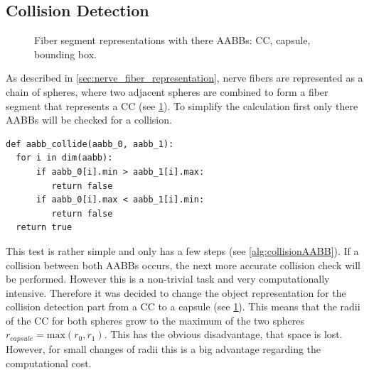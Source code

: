 \subsection{Collision Detection}
\label{sec:collisionDetection}
%
\begin{figure}[!t]
    \centering
    \setlength{\tikzwidth}{0.75\textwidth}
    \tikzset{external/export=false}
	\caption[cc and co]{Fiber segment representations with there \acp{AABB}:  \ac{CC},  capsule,  bounding box.}
	\label{fig:conical_capsule}
\end{figure}
% 
As described in \cref{sec:nerve_fiber_representation}, nerve fibers are represented as a chain of spheres, where two adjacent spheres are combined to form a fiber segment that represents a \ac{CC} (see \cref{fig:conical_capsule}).
%
To simplify the calculation first only there \acp{AABB} will be checked for a collision.
%
\begin{lstfloat}[!tb]
\lstset{style=python}
\begin{lstlisting}[]
def aabb_collide(aabb_0, aabb_1):
  for i in dim(aabb):
      if aabb_0[i].min > aabb_1[i].max:
         return false
      if aabb_0[i].max < aabb_1[i].min:
         return false
  return true
\end{lstlisting}
\caption{Pseudocode collision between \acp{AABB}.}
\label{alg:collisionAABB}
\end{lstfloat}
%
This test is rather simple and only has a few steps (see \cref{alg:collisionAABB}).
If a collision between both \acp{AABB} occurs, the next more accurate collision check will be performed.
%
However this is a non-trivial task and very computationally intensive.
Therefore it was decided to change the object representation for the collision detection part from a \ac{CC} to a capsule (see \cref{fig:conical_capsule}).
This means that the radii of the \ac{CC} for both spheres grow to the maximum of the two spheres $r_{\mathit{capsule}} = \mathrm{max}(r_0, r_1)$.
This has the obvious disadvantage, that space is lost. However, for small changes of radii this is a big advantage regarding the computational cost.
\par
% 
